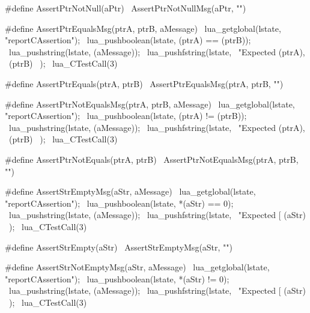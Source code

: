 #define AssertPtrNotNull(aPtr) \
  AssertPtrNotNullMsg(aPtr, "")
\stopCHeader

\stopTestSuite

\startTestSuite[assertPtrEquals]

\startCHeader
#define AssertPtrEqualsMsg(ptrA, ptrB, aMessage) \
  lua_getglobal(lstate, "reportCAssertion");     \
  lua_pushboolean(lstate, (ptrA) == (ptrB));     \
  lua_pushstring(lstate, (aMessage));            \
  lua_pushfstring(lstate,                        \
      "Expected %
      (ptrA),                                    \
      (ptrB)                                     \
    );                                           \
  lua_CTestCall(3)

#define AssertPtrEquals(ptrA, ptrB) \
  AssertPtrEqualsMsg(ptrA, ptrB, "")
\stopCHeader

\stopTestSuite

\startTestSuite[assertPtrNotEquals]

\startCHeader
#define AssertPtrNotEqualsMsg(ptrA, ptrB, aMessage) \
  lua_getglobal(lstate, "reportCAssertion");        \
  lua_pushboolean(lstate, (ptrA) != (ptrB));        \
  lua_pushstring(lstate, (aMessage));               \
  lua_pushfstring(lstate,                           \
      "Expected %
      (ptrA),                                       \
      (ptrB)                                        \
    );                                              \
  lua_CTestCall(3)

#define AssertPtrNotEquals(ptrA, ptrB) \
  AssertPtrNotEqualsMsg(ptrA, ptrB, "")
\stopCHeader

\stopTestSuite

\startTestSuite[assertStrEmpty]

\startCHeader
#define AssertStrEmptyMsg(aStr, aMessage)    \
  lua_getglobal(lstate, "reportCAssertion"); \
  lua_pushboolean(lstate, *(aStr) == 0);     \
  lua_pushstring(lstate, (aMessage));        \
  lua_pushfstring(lstate,                    \
      "Expected [%
      (aStr)                                 \
    );                                       \
  lua_CTestCall(3)

#define AssertStrEmpty(aStr) \
  AssertStrEmptyMsg(aStr, "")
\stopCHeader

\stopTestSuite

\startTestSuite[assertStrNotEmpty]

\startCHeader
#define AssertStrNotEmptyMsg(aStr, aMessage) \
  lua_getglobal(lstate, "reportCAssertion"); \
  lua_pushboolean(lstate, *(aStr) != 0);     \
  lua_pushstring(lstate, (aMessage));        \
  lua_pushfstring(lstate,                    \
      "Expected [%
      (aStr)                                 \
    );                                       \
  lua_CTestCall(3)

